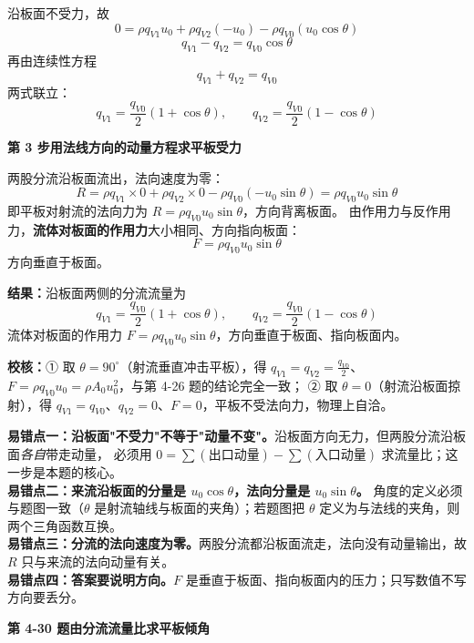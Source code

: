 \begin{jie}
沿板面不受力，故
\[ 0=\rho q_{V1}u_0+\rho q_{V2}(-u_0)-\rho q_{V0}\left(u_0\cos\theta\right) \]
\[ q_{V1}-q_{V2}=q_{V0}\cos\theta \]
再由连续性方程
\[ q_{V1}+q_{V2}=q_{V0} \]
两式联立：
\[ q_{V1}=\frac{q_{V0}}{2}\left(1+\cos\theta\right),\qquad
   q_{V2}=\frac{q_{V0}}{2}\left(1-\cos\theta\right) \]

\textbf{第 3 步\quad 用法线方向的动量方程求平板受力}

两股分流沿板面流出，法向速度为零：
\[ R=\rho q_{V1}\times0+\rho q_{V2}\times0-\rho q_{V0}\left(-u_0\sin\theta\right)=\rho q_{V0}u_0\sin\theta \]
即平板对射流的法向力为 $R=\rho q_{V0}u_0\sin\theta$，方向背离板面。
由作用力与反作用力，\textbf{流体对板面的作用力}大小相同、方向指向板面：
\[ F=\rho q_{V0}u_0\sin\theta \]
方向垂直于板面。

\textbf{结果：}沿板面两侧的分流流量为
\[ q_{V1}=\frac{q_{V0}}{2}\left(1+\cos\theta\right),\qquad
   q_{V2}=\frac{q_{V0}}{2}\left(1-\cos\theta\right) \]
流体对板面的作用力 $F=\rho q_{V0}u_0\sin\theta$，方向垂直于板面、指向板面内。

\textbf{校核：}① 取 $\theta=90^\circ$（射流垂直冲击平板），得 $q_{V1}=q_{V2}=\frac{q_{V0}}{2}$、
$F=\rho q_{V0}u_0=\rho A_0u_0^2$，与第 4-26 题的结论完全一致；
② 取 $\theta=0$（射流沿板面掠射），得 $q_{V1}=q_{V0}$、$q_{V2}=0$、$F=0$，平板不受法向力，物理上自洽。
\end{jie}

\begin{yicuo}
\textbf{易错点一：沿板面"不受力"不等于"动量不变"。}沿板面方向无力，但两股分流沿板面\emph{各自}带走动量，
必须用 $0=\sum(\text{出口动量})-\sum(\text{入口动量})$ 求流量比；这一步是本题的核心。\\
\textbf{易错点二：来流沿板面的分量是 $u_0\cos\theta$，法向分量是 $u_0\sin\theta$。}
角度的定义必须与题图一致（$\theta$ 是射流轴线与板面的夹角）；若题图把 $\theta$ 定义为与法线的夹角，则两个三角函数互换。\\
\textbf{易错点三：分流的法向速度为零。}两股分流都沿板面流走，法向没有动量输出，故 $R$ 只与来流的法向动量有关。\\
\textbf{易错点四：答案要说明方向。}$F$ 是垂直于板面、指向板面内的压力；只写数值不写方向要丢分。
\end{yicuo}

\noindent\textbf{第 4-30 题\quad 由分流流量比求平板倾角}

